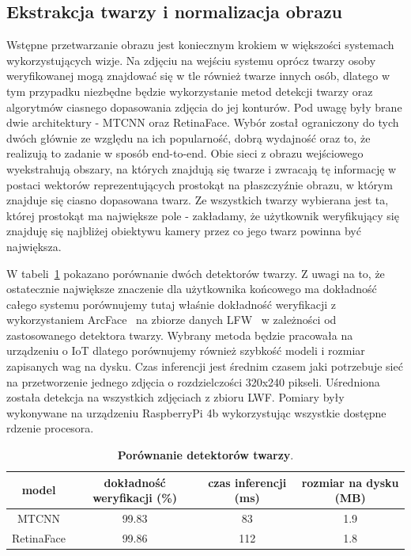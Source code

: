 \subsection{Ekstrakcja twarzy i normalizacja obrazu}\label{sec:ekstrakcja_twarzy}
Wstępne przetwarzanie obrazu jest koniecznym krokiem w większości systemach wykorzystujących
wizje. Na zdjęciu na wejściu systemu oprócz twarzy osoby weryfikowanej mogą znajdować się 
w tle również twarze innych osób, dlatego w tym przypadku niezbędne będzie wykorzystanie metod
detekcji twarzy oraz algorytmów ciasnego dopasowania zdjęcia do jej konturów. Pod uwagę były
brane dwie architektury - MTCNN oraz RetinaFace. Wybór został ograniczony do tych dwóch głównie
ze względu na ich popularność, dobrą wydajność oraz to, że realizują to zadanie w sposób
end-to-end. Obie sieci z obrazu wejściowego wyekstrahują obszary, na których znajdują się twarze
i zwracają tę informację w postaci wektorów reprezentujących prostokąt na płaszczyźnie obrazu, w
którym znajduje się ciasno dopasowana twarz. Ze wszystkich twarzy wybierana jest ta, której
prostokąt ma największe pole - zakładamy, że użytkownik weryfikujący się znajduję się najbliżej
obiektywu kamery przez co jego twarz powinna być największa.

W tabeli~\ref{table:face_detector} pokazano porównanie dwóch detektorów twarzy. Z uwagi na to, że
ostatecznie największe znaczenie dla użytkownika końcowego ma dokładność całego systemu
porównujemy tutaj właśnie dokładność weryfikacji z wykorzystaniem ArcFace~\cite{Arcface} na
zbiorze danych LFW~\cite{DatasetLFW} w zależności od zastosowanego detektora twarzy. Wybrany
metoda będzie pracowała na urządzeniu o IoT dlatego porównujemy również szybkość modeli i 
rozmiar zapisanych wag na dysku. Czas inferencji jest średnim czasem jaki potrzebuje sieć na
przetworzenie jednego zdjęcia o rozdzielczości 320x240 pikseli. Uśredniona została detekcja na
wszystkich zdjęciach z zbioru LWF. Pomiary były wykonywane na urządzeniu RaspberryPi 4b
wykorzystując wszystkie dostępne rdzenie procesora.

\begin{table}[h]
\begin{center}
\begin{tabular}{cccc}
\hline
model & dokładność weryfikacji (\%)  &  czas inferencji (ms)  &   rozmiar na dysku (MB)  \\
\hline
MTCNN \cite{MTCNN}     & \num{99.83} & \num{83} & \num{1.9} \\ 
RetinaFace \cite{RetinaFace}   & \num{99.86}  & \num{112}& \num{1.8}  \\
\hline
\end{tabular}
\end{center}
\caption{\textbf{Porównanie detektorów twarzy}.}
\label{table:face_detector}
\vspace{-4mm}
\end{table}

